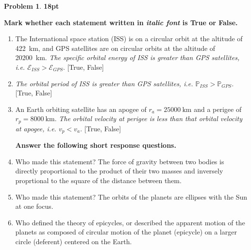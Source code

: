 \documentclass[10pt]{article}
\theoremstyle{definition}
\newtheorem{prob}{Problem}[section]
\renewcommand{\theprob}{\arabic{prob}}
\newenvironment{subprob}%
{\renewcommand{\theenumi}{\alph{enumi}}\renewcommand{\labelenumi}{(\theenumi)}\begin{enumerate}}%
{\end{enumerate}}%
\begin{document}
\clearpage\newpage
\begin{prob}
    \textbf{18pt} 
    
    \textbf{Mark whether each statement written in \textit{italic font} is True or False.}
\begin{subprob}

    \item The International space station (ISS) is on a circular orbit at the altitude of \SI{422}{\kilo\meter}, and GPS satellites are on circular orbits at the altitude of \SI{20200}{\kilo\meter}. \textit{The specific orbital energy of ISS is greater than GPS satellites, i.e. $\mathcal{E}_{ISS} > \mathcal{E}_{GPS}$}. [True, False]

    \vspace*{1cm}

\item \textit{The orbital period of ISS is greater than GPS satellites, i.e. $\mathbb{P}_{ISS} > \mathbb{P}_{GPS}$.} [True, False]

    \vspace*{1cm}
    
\item An Earth orbiting satellite has an apogee of \( r_a = \SI{25000}{\kilo\meter} \) and a perigee of \( r_p = \SI{8000}{\kilo\meter} \). 
    \textit{The orbital velocity at perigee is less than that orbital velocity at apogee, i.e. \( v_p < v_a \).} [True, False]

    \vspace*{1cm}
\textbf{Answer the following short response questions.}

    \item Who made this statement? The force of gravity between two bodies is directly proportional to the product of their two masses and inversely proprtional to the square of the distance between them.

    \vspace*{1cm}

    \item Who made this statement? The orbits of the planets are ellipses with the Sun at one focus.

    \vspace*{1cm}

    \item Who defined the theory of epicycles, or described the apparent motion of the planets as composed of circular motion of the planet (epicycle) on a larger circle (deferent) centered on the Earth.


\end{subprob}
\end{prob}
\end{document}
